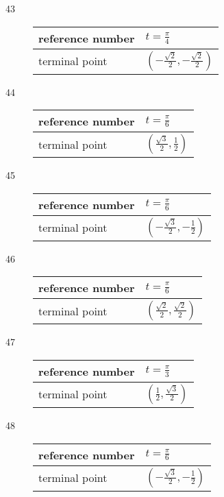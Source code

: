 \documentclass{exam}
\begin{document}
\begin{description}
      \item[43]
        \begin{tabular}[H]{ll}
          \toprule
          reference number & $t = \frac{\pi}{4}$ \\
          \midrule
          terminal point   & $\left( - \frac{\sqrt{2}}{2}, - \frac{\sqrt{2}}{2} \right)$ \\
          \bottomrule
        \end{tabular}

      \item[44]
        \begin{tabular}[H]{ll}
          \toprule
          reference number & $t = \frac{\pi}{6}$ \\
          \midrule
          terminal point   & $\left( \frac{\sqrt{3}}{2}, \frac{1}{2} \right)$ \\
          \bottomrule
        \end{tabular}

      \item[45]
        \begin{tabular}[H]{ll}
          \toprule
          reference number & $t = \frac{\pi}{6}$ \\
          \midrule
          terminal point   & $\left( - \frac{\sqrt{3}}{2}, - \frac{1}{2} \right)$ \\
          \bottomrule
        \end{tabular}

      \item[46]
        \begin{tabular}[H]{ll}
          \toprule
          reference number & $t = \frac{\pi}{6}$ \\
          \midrule
          terminal point   & $\left( \frac{\sqrt{2}}{2}, \frac{\sqrt{2}}{2} \right)$ \\
          \bottomrule
        \end{tabular}

      \item[47]
        \begin{tabular}[H]{ll}
          \toprule
          reference number & $t = \frac{\pi}{3}$ \\
          \midrule
          terminal point   & $\left( \frac{1}{2}, \frac{\sqrt{3}}{2} \right)$ \\
          \bottomrule
        \end{tabular}

      \item[48]
        \begin{tabular}[H]{ll}
          \toprule
          reference number & $t = \frac{\pi}{6}$ \\
          \midrule
          terminal point   & $\left( - \frac{\sqrt{3}}{2}, - \frac{1}{2} \right)$ \\
          \bottomrule
        \end{tabular}


\end{description}
\end{document}
